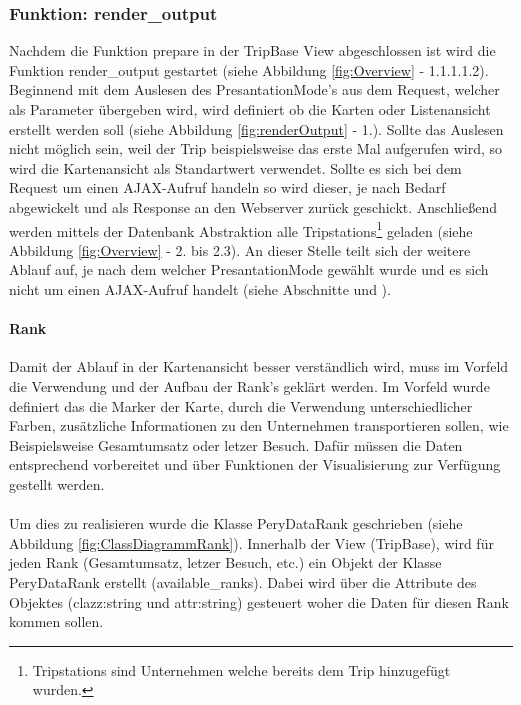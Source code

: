 \documentclass[Bachelorarbeit.tex]{subfiles}
\begin{document}
\subsubsection*{Funktion: render\_output}
\label{renderOutput}
Nachdem die Funktion prepare in der TripBase View abgeschlossen ist wird die Funktion render\_output gestartet (siehe Abbildung \ref{fig:Overview} - 1.1.1.1.2).
Beginnend mit dem Auslesen des PresantationMode's aus dem Request, welcher als Parameter übergeben wird, wird definiert ob die Karten oder Listenansicht erstellt werden soll (siehe Abbildung \ref{fig:renderOutput} - 1.).
Sollte das Auslesen nicht möglich sein, weil der Trip beispielsweise das erste Mal aufgerufen wird, so wird die Kartenansicht als Standartwert verwendet.
Sollte es sich bei dem Request um einen \ac{AJAX}-Aufruf handeln so wird dieser, je nach Bedarf abgewickelt und als Response an den Webserver zurück geschickt.
Anschließend werden mittels der Datenbank Abstraktion alle Tripstations\footnote{Tripstations sind Unternehmen welche bereits dem Trip hinzugefügt wurden.} geladen (siehe Abbildung \ref{fig:Overview} - 2. bis 2.3).
An dieser Stelle teilt sich der weitere Ablauf auf, je nach dem welcher PresantationMode gewählt wurde und es sich nicht um einen \ac{AJAX}-Aufruf handelt (siehe Abschnitte  und ).\\


\paragraph{Rank}
\label{Rank}
Damit der Ablauf in der Kartenansicht besser verständlich wird, muss im Vorfeld die Verwendung und der Aufbau der Rank's geklärt werden.
Im Vorfeld wurde definiert das die Marker der Karte, durch die Verwendung unterschiedlicher Farben, zusätzliche Informationen zu den Unternehmen transportieren sollen, wie Beispielsweise Gesamtumsatz oder letzer Besuch.
Dafür müssen die Daten entsprechend vorbereitet und über Funktionen der Visualisierung zur Verfügung gestellt werden. \\
\\
Um dies zu realisieren wurde die Klasse PeryDataRank geschrieben (siehe Abbildung \ref{fig:ClassDiagrammRank}). 
Innerhalb der View (TripBase), wird für jeden Rank (Gesamtumsatz, letzer Besuch, etc.) ein Objekt der Klasse PeryDataRank erstellt (available\_ranks).
Dabei wird über die Attribute des Objektes (clazz:string und attr:string) gesteuert woher die Daten für diesen Rank kommen sollen. \\
\end{document}
